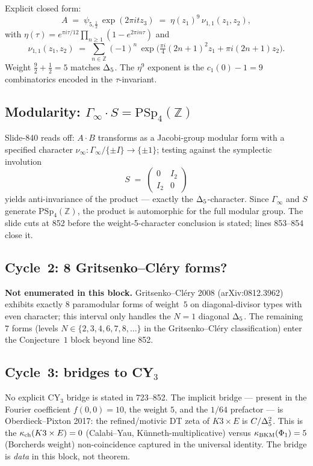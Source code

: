 Explicit closed form:
\[
  A \;=\; \psi_{5, \frac{1}{2}}\,\exp(2\pi i t z_3) \;=\; \eta(z_1)^9\,\nu_{1,1}(z_1, z_2),
\]
with $\eta(\tau) = e^{\pi i \tau / 12}\prod_{n \geq 1}(1 - e^{2\pi i n \tau})$ and
\[
  \nu_{1,1}(z_1, z_2) \;=\; \sum_{n \in \mathbb{Z}} (-1)^n\,\exp\!\Big(\tfrac{\pi i}{4}(2n+1)^2 z_1 + \pi i (2n+1) z_2\Big).
\]
Weight $\tfrac{9}{2} + \tfrac{1}{2} = 5$ matches $\Delta_5$. The $\eta^9$
exponent is the $c_1(0) - 1 = 9$ combinatorics encoded in the $\tau$-invariant.

\subsection*{Modularity: $\Gamma_\infty \cdot S = \mathrm{PSp}_4(\mathbb{Z})$}

Slide-840 reads off: $A \cdot B$ transforms as a Jacobi-group modular form with a
specified character $\nu_\infty : \Gamma_\infty / \{\pm I\} \to \{\pm 1\}$; testing
against the symplectic involution
\[
  S \;=\; \begin{pmatrix} 0 & I_2 \\ I_2 & 0 \end{pmatrix}
\]
yields anti-invariance of the product --- exactly the $\Delta_5$-character.
Since $\Gamma_\infty$ and $S$ generate $\mathrm{PSp}_4(\mathbb{Z})$, the product is
automorphic for the full modular group. The slide cuts at 852 before the
weight-5-character conclusion is stated; lines 853--854 close it.

\subsection*{Cycle~2: 8 Gritsenko--Cl\'ery forms?}

\textbf{Not enumerated in this block.} Gritsenko--Cl\'ery 2008
(arXiv:0812.3962) exhibits exactly $8$ paramodular forms of weight~$5$
on diagonal-divisor types with even character; this interval only
handles the $N=1$ diagonal $\Delta_5$. The remaining $7$ forms (levels
$N \in \{2, 3, 4, 6, 7, 8, \ldots\}$ in the Gritsenko--Cl\'ery
classification) enter the Conjecture~$1$ block beyond line 852.

\subsection*{Cycle~3: bridges to CY$_3$}

No explicit CY$_3$ bridge is stated in 723--852. The implicit bridge
--- present in the Fourier coefficient $f(0, 0) = 10$, the weight $5$,
and the $1/64$ prefactor --- is Oberdieck--Pixton 2017: the
refined/motivic DT zeta of $K3 \times E$ is $C/\Delta_5^2$. This is the
$\kappa_{\mathrm{ch}}(K3 \times E) = 0$ (Calabi--Yau, K\"unneth-multiplicative) versus
$\kappa_{\mathrm{BKM}}(\Phi_1) = 5$ (Borcherds weight) non-coincidence captured in the
universal identity. The bridge is \emph{data} in this block, not theorem.


